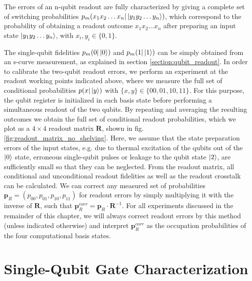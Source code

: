 The errors of an n-qubit readout are fully characterized by giving a complete set of switching probabilities $p_m(x_{1}x_{2}\hdots x_n|\left| y_{1}y_{2}\hdots y_n \right>)$, which correspond to the probability of obtaining a readout outcome $x_{1}x_{2}\hdots x_{n}$ after preparing an input state $\left| y_{1}y_{2}\hdots y_{n} \right>$, with $x_i,y_i\in \{0,1\}$. 

\smallskip

The single-qubit fidelities $p_m(0|\left| 0 \right>)$ and $p_m(1|\left| 1 \right>)$ can be simply obtained from an s-curve measurement, as explained in section \ref{section:qubit_readout}. In order to calibrate the two-qubit readout errors, we perform an experiment at the readout working points indicated above, where we measure the full set of conditional probabilities $p(x|\left| y \right>)$ with $\{x,y\}\in\{00,01,10,11\}$. For this purpose, the qubit register is initialized in each basis state before performing a simultaneous readout of the two qubits. By repeating and averaging the resulting outcomes we obtain the full set of conditional readout probabilities, which we plot as a $4\times 4$ readout matrix $\mathbf{R}$, shown in fig. \ref{fig:readout_matrix_no_shelving}. Here, we assume that the state preparation errors of the input states, e.g. due to thermal excitation of the qubits out of the $\left| 0 \right>$ state, erroneous single-qubit pulses or leakage to the qubit state $\left| 2 \right>$, are sufficiently small so that they can be neglected. From the readout matrix, all conditional and unconditional readout fidelities as well as the readout crosstalk can be calculated. We can correct any measured set of probabilities $\mathbf{p}_R=(p_{00},p_{01},p_{10},p_{11})$ for readout errors by simply multiplying it with the inverse of $\mathbf{R}$, such that $\mathbf{p}_R^{corr}=\mathbf{p}_R\cdot \mathbf{R}^{-1}$. For all experiments discussed in the remainder of this chapter, we will always correct readout errors by this method (unless indicated otherwise) and interpret $\mathbf{p}_R^{corr}$ as the occupation probabilities of the four computational basis states.

\section{Single-Qubit Gate Characterization}

